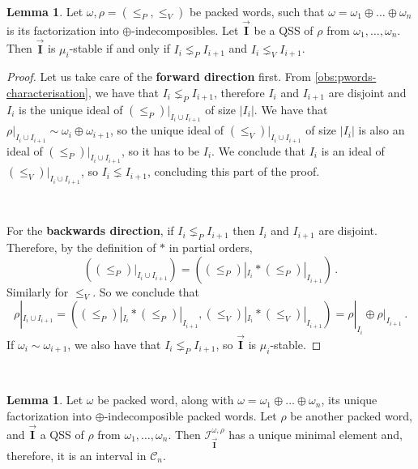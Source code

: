 \documentclass[12pt, reqno]{amsart}
\theoremstyle{definition}
\newtheorem{lm}[thm]{Lemma}
\newcommand{\III}{\vec{\mathbf{I}}}
\begin{document}
\

\begin{lm}\label{lm:QSSpackedWords}
Let $\omega, \rho = (\leq_P, \leq_V)$ be packed words, such that $\omega = \omega_1 \oplus \dots \oplus \omega_n$ is its factorization into $\oplus$-indecomposibles.
Let $\III$ be a QSS of $\rho$ from $\omega_1, \dots , \omega_n$.
Then $\III$ is $\mu_i$-stable if and only if $I_i \lneq_P I_{i+1}$ and $I_i \lneq_V I_{i+1}$.
\end{lm}


\begin{proof}
Let us take care of the \textbf{forward direction} first.
From \cref{obs:pwords-characterisation}, we have that $I_i \lneq_P I_{i+1}$, therefore $I_i$ and $I_{i+1}$ are disjoint and $I_i$ is the unique ideal of $(\leq_P)|_{I_i \cup I_{i+1}}$ of size $|I_i|$.
We have that $\rho|_{I_i \cup I_{i+1}} \sim \omega_i \oplus \omega_{i+1}$, so the unique ideal of $(\leq_V)|_{I_i \cup I_{i+1}}$ of size $|I_i|$ is also an ideal of $(\leq_P)|_{I_i \cup I_{i+1}}$, so it has to be $I_i$.
We conclude that $I_i$ is an ideal of $(\leq_V)|_{I_i \cup I_{i+1}}$, so $I_i \lneq I_{i+1}$, concluding this part of the proof.

\

For the \textbf{backwards direction}, if $I_i \lneq_P I_{i+1}$ then $I_i$ and $I_{i+1}$ are disjoint.
Therefore, by the definition of $\ast $ in partial orders, 
$$((\leq_P)|_{I_i \cup I_{i+1}}) = ((\leq_P)|_{I_i} \ast (\leq_P)|_{I_{i+1}})\, . $$
Similarly for $\leq_V$.
So we conclude that 
$$\rho|_{I_i \cup I_{i+1}} = ((\leq_P)|_{I_i} \ast (\leq_P)|_{I_{i+1}}, (\leq_V)|_{I_i} \ast (\leq_V)|_{I_{i+1}}) = \rho|_{I_i} \oplus \rho|_{I_{i+1}}\, .  $$
If $\omega_i \sim \omega_{i+1}$, we also have that $I_i \lneq_P I_{i+1}$, so $\III$ is $\mu_i$-stable.
\end{proof}

\

\begin{lm}\label{lm:minpacked}
Let $\omega$ be  packed word, along with $\omega = \omega_1 \oplus \dots \oplus \omega_n$, its unique factorization into $\oplus$-indecomposible packed words.
Let $\rho$ be another packed word, and $\III$ a QSS of $\rho$ from $\omega_1, \dots , \omega_n$. Then $\mathcal I^{\omega, \rho}_{\III}$ has a unique minimal element and, therefore, it is an interval in $\mathcal C_n$.
\end{lm}
\end{document}
